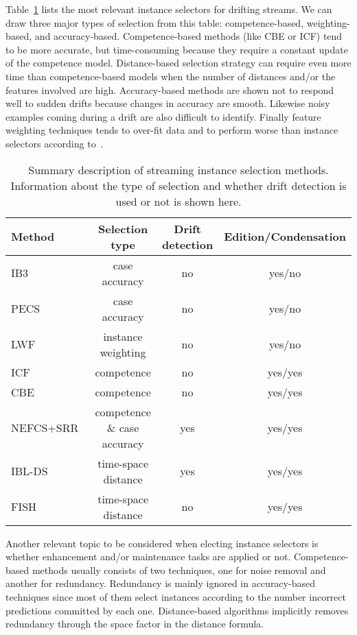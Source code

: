 \documentclass[preprint,12pt]{elsarticle}
\begin{document}
Table~\ref{tab:instance} lists the most relevant instance selectors for drifting streams. We can draw three major types of selection from this table: competence-based, weighting-based, and accuracy-based. Competence-based methods (like CBE or ICF) tend to be more accurate, but time-consuming because they require a constant update of the competence model. Distance-based selection strategy can require even more time than competence-based models when the number of distances and/or the features involved are high. Accuracy-based methods are shown not to respond well to sudden drifts because changes in accuracy are smooth. Likewise noisy examples coming during a drift are also difficult to identify. Finally feature weighting techniques tends to over-fit data and to perform worse than instance selectors according to~\cite{klinken04}.

\begin{table}[!htp]
\renewcommand{\arraystretch}{1.3}
\centering
\scriptsize
\caption{Summary description of streaming instance selection methods. Information about the type of selection and whether drift detection is used or not is shown here.}
\label{tab:instance}
\begin{tabular}{ lccc }
\toprule
{\bf Method} & {\bf Selection type} & {\bf Drift detection} & {\bf Edition/Condensation} \\
\midrule
IB3~\cite{aha91} & case accuracy & no & yes/no\\
PECS~\cite{salga97} & case accuracy & no & yes/no\\
LWF~\cite{salga93} & instance weighting & no & yes/no\\
ICF~\cite{brighton02} & competence & no & yes/yes\\
CBE~\cite{delany05} & competence & no & yes/yes\\
NEFCS+SRR~\cite{lu16} & competence \& case accuracy & yes & yes/yes\\
IBL-DS~\cite{berin07} & time-space distance & yes & yes/yes\\
FISH~\cite{zlio11} & time-space distance & no & yes/yes\\
\bottomrule
\end{tabular}
\end{table}

Another relevant topic to be considered when electing instance selectors is whether enhancement and/or maintenance tasks are applied or not. Competence-based methods usually consists of two techniques, one for noise removal and another for redundancy. Redundancy is mainly ignored in accuracy-based techniques since most of them select instances according to the number incorrect predictions committed by each one. Distance-based algorithms implicitly removes redundancy through the space factor in the distance formula.
\end{document}
